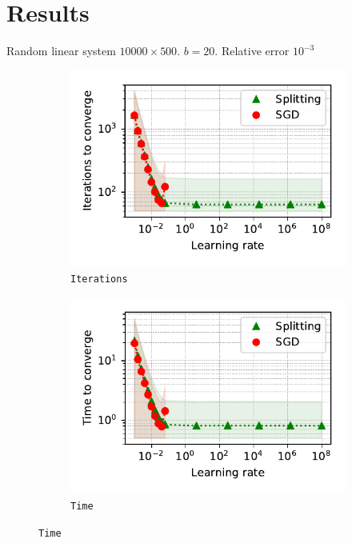 \documentclass[aspectratio=169]{beamer}
\begin{document}
\section{Results}

\begin{frame}{Random linear system}
$10000\times500$. $b = 20$. Relative error $10^{-3}$
\begin{figure}
    \begin{subfigure}[b]{0.5\textwidth}
            \centering
            \includegraphics[width=\linewidth]{LLS_iter.pdf}
            \vspace{-25pt}
            \caption{{\small \texttt{Iterations}}}
            \vspace{-22pt}
    \end{subfigure}%
    \begin{subfigure}[b]{0.5\textwidth}
            \centering
            \includegraphics[width=\linewidth]{LLS_time.pdf}
            \vspace{-25pt}
            \caption{{\small \texttt{Time}}}
            \vspace{-22pt}
    \end{subfigure}%
\end{figure}
\end{frame}
\end{document}
